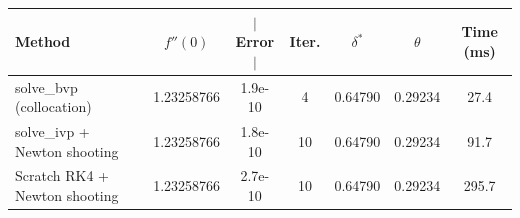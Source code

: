 \begin{tabular}{lcccccc}
\toprule
Method & $f''(0)$ & $|$Error$|$ & Iter. & $\delta^*$ & $\theta$ & Time (ms) \\
\midrule
solve\_bvp (collocation) & 1.23258766 & 1.9e-10 & 4 & 0.64790 & 0.29234 & 27.4 \\
solve\_ivp + Newton shooting & 1.23258766 & 1.8e-10 & 10 & 0.64790 & 0.29234 & 91.7 \\
Scratch RK4 + Newton shooting & 1.23258766 & 2.7e-10 & 10 & 0.64790 & 0.29234 & 295.7 \\
\bottomrule
\end{tabular}
